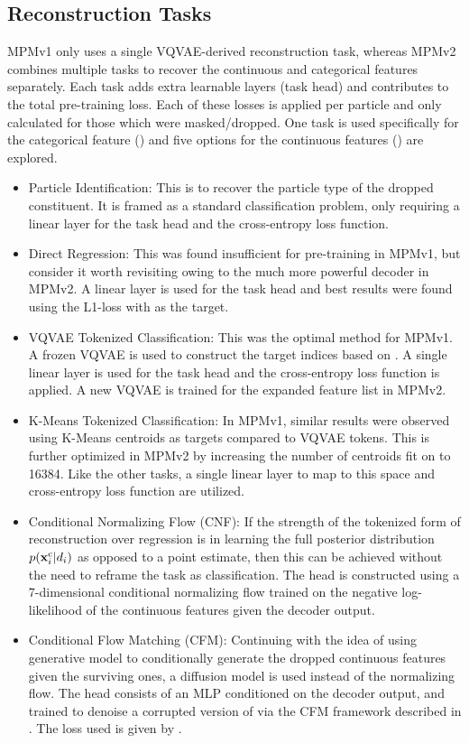 \subsection{Reconstruction Tasks}
\label{sec:recovery}

MPMv1 only uses a single VQVAE-derived reconstruction task, whereas MPMv2 combines multiple tasks to recover the continuous and categorical features separately.
Each task adds extra learnable layers (task head) and contributes to the total pre-training loss.
Each of these losses is applied per particle and only calculated for those which were masked/dropped.
One task is used specifically for the categorical feature (\xid) and five options for the continuous features (\xc) are explored.

\begin{itemize}
    \item Particle Identification: This is to recover the particle type \xid of the dropped constituent.
          It is framed as a standard classification problem, only requiring a linear layer for the task head and the cross-entropy loss function.
    \item Direct Regression: This was found insufficient for pre-training in MPMv1, but consider it worth revisiting owing to the much more powerful decoder in MPMv2.
          A linear layer is used for the task head and best results were found using the L1-loss with \xc as the target.
    \item VQVAE Tokenized Classification: This was the optimal method for MPMv1.
          A frozen VQVAE is used to construct the target indices based on \xc.
          A single linear layer is used for the task head and the cross-entropy loss function is applied.
          A new VQVAE is trained for the expanded feature list in MPMv2.
    \item K-Means Tokenized Classification: In MPMv1, similar results were observed using K-Means centroids as targets compared to VQVAE tokens.
          This is further optimized in MPMv2 by increasing the number of centroids fit on \xc to 16384.
          Like the other tasks, a single linear layer to map to this space and cross-entropy loss function are utilized.
    \item Conditional Normalizing Flow (CNF): If the strength of the tokenized form of reconstruction over regression is in learning the full posterior distribution $p(\mathbf{x}^\text{c}_i|d_i)$ as opposed to a point estimate, then this can be achieved without the need to reframe the task as classification.
          The head is constructed using a 7-dimensional conditional normalizing flow trained on the negative log-likelihood of the continuous features given the decoder output.
    \item Conditional Flow Matching (CFM): Continuing with the idea of using generative model to conditionally generate the dropped continuous features given the surviving ones, a diffusion model is used instead of the normalizing flow.
          The head consists of an MLP conditioned on the decoder output, and trained to denoise a corrupted version of \xc via the CFM framework described in .
          The loss used is given by .
\end{itemize}

